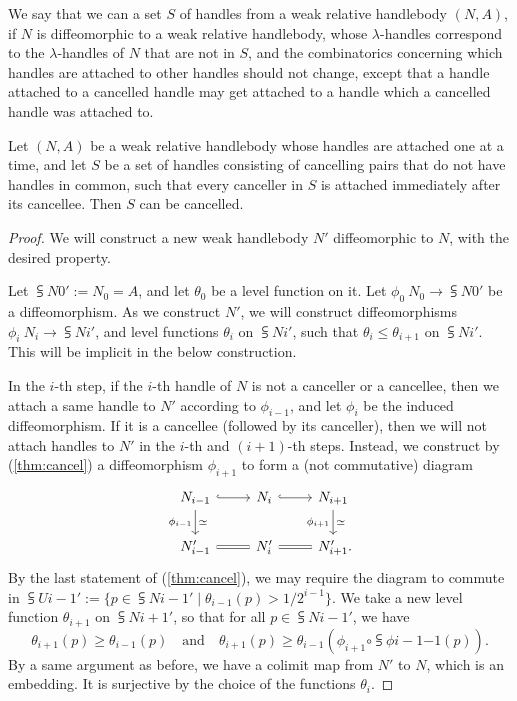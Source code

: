 We say that we can  a set $S$ of handles from a weak relative handlebody $(N,A)$,
if $N$ is diffeomorphic to a weak relative handlebody,
whose $\lambda$-handles correspond to
the $\lambda$-handles of $N$ that are not in $S$,
and the combinatorics concerning which handles are attached to other handles should not change,
except that a handle attached to a cancelled handle may get attached to
a handle which a cancelled handle was attached to.

\begin{theorem} \label{thm:cancel-infinite}
Let $(N,A)$ be a weak relative handlebody whose handles are attached one at a time,
and let $S$ be a set of handles consisting of cancelling pairs
that do not have handles in common,
such that every canceller in $S$ is attached immediately after its cancellee.
Then $S$ can be cancelled.
\end{theorem}

\begin{proof}
We will construct a new weak handlebody $N'$ diffeomorphic to $N$,
with the desired property.

Let $\subsup N0\prime:=N_0=A$, and let $\theta_0$ be a level function on it.
Let $\phi_0\:N_0\to\subsup N0\prime$ be a diffeomorphism.
As we construct $N'$, we will construct diffeomorphisms $\phi_i\:N_i\to\subsup Ni\prime$,
and level functions $\theta_i$ on $\subsup Ni\prime$,
such that $\theta_i\leq\theta_{i+1}$ on $\subsup Ni\prime$.
This will be implicit in the below construction.

In the $i$-th step, if the $i$-th handle of $N$ is not a canceller or a cancellee,
then we attach a same handle to $N'$ according to $\phi_{i-1}$,
and let $\phi_i$ be the induced diffeomorphism.
If it is a cancellee (followed by its canceller),
then we will not attach handles to $N'$ in the $i$-th and $(i+1)$-th steps.
Instead, we construct by (\ref{thm:cancel}) a diffeomorphism $\phi_{i+1}$ to form a (not commutative) diagram
\[ \begin{tikzcd}
N_{i-1}\ar[d,"\phi_{i-1}"',"\simeq"]\ar[r,hook] &N_i\ar[r,hook] &N_{i+1}\ar[d,"\phi_{i+1}"',"\simeq"]\\
\subsup N{i-1}\prime\ar[r,equals] &\subsup Ni\prime\ar[r,equals] &\subsup N{i+1}\prime\rlap.
\end{tikzcd} \]
By the last statement of (\ref{thm:cancel}), we may require the diagram to commute in
$\subsup U{i-1}\prime:=\{p\in\subsup N{i-1}\prime\mid\theta_{i-1}(p)>1/2^{i-1}\}$.
We take a new level function $\theta_{i+1}$ on $\subsup N{i+1}\prime$,
so that for all $p\in\subsup N{i-1}\prime$, we have
\[\theta_{i+1}(p)\geq\theta_{i-1}(p)\quad\text{and}\quad
\theta_{i+1}(p)\geq\theta_{i-1}(\phi_{i+1}\circ\subsup{\phi}{i-1}{-1}(p)).\]
By a same argument as before, we have a colimit map from $N'$ to $N$,
which is an embedding. It is surjective by the choice of the functions $\theta_i$.
\end{proof}

